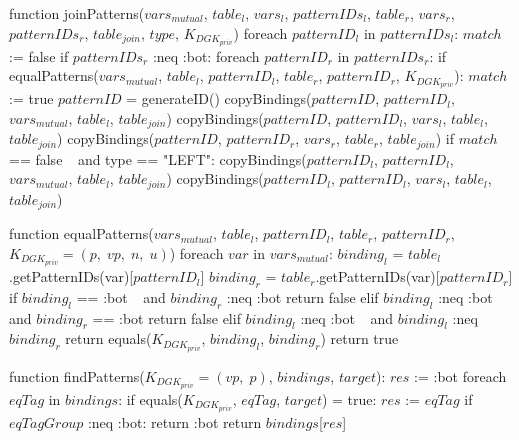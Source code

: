 function joinPatterns($vars_{mutual}$, $table_l$, $vars_l$, $patternIDs_l$, $table_r$, $vars_r$, $patternIDs_r$, $table_{join}$, $type$, $K_{DGK_{priv}}$) 
    foreach $patternID_l$ in $patternIDs_l$:
        $match$ := false
        if $patternIDs_r$ :neq :bot:
            foreach $patternID_r$ in $patternIDs_r$:
                if equalPatterns($vars_{mutual}$, $table_l$, $patternID_l$, $table_r$, $patternID_r$, $K_{DGK_{priv}}$): 
                    $match$ := true
                    $patternID$ = generateID()
                    copyBindings($patternID$, $patternID_l$, $vars_{mutual}$, $table_l$, $table_{join}$)
                    copyBindings($patternID$, $patternID_l$, $vars_l$, $table_l$, $table_{join}$)
                    copyBindings($patternID$, $patternID_r$, $vars_r$, $table_r$, $table_{join}$)
        if $match$ == false $\:\:$ and type == "LEFT": 
            copyBindings($patternID_l$, $patternID_l$, $vars_{mutual}$, $table_l$, $table_{join}$)
            copyBindings($patternID_l$, $patternID_l$, $vars_l$, $table_l$, $table_{join}$)

function equalPatterns($vars_{mutual}$, $table_l$, $patternID_l$, $table_r$, $patternID_r$, $K_{DGK_{priv}} = (p, \; vp, \; n, \; u)$) 
    foreach $var$ in $vars_{mutual}$: 
        $binding_l$ = $table_l$.getPatternIDs(var)[$patternID_l$]
        $binding_r$ = $table_r$.getPatternIDs(var)[$patternID_r$]
        if $binding_l$ == :bot $\:\:$ and $binding_r$ :neq :bot
            return false
        elif $binding_l$ :neq :bot $\:\:$ and $binding_r$ == :bot
            return false
        elif $binding_l$ :neq :bot $\:\:$ and $binding_l$ :neq $binding_r$
            return equals($K_{DGK_{priv}}$, $binding_l$, $binding_r$)
    return true

function findPatterns($K_{DGK_{priv}} = (vp, \; p)$, $bindings$, $target$):
    $res$ := :bot
    foreach $eqTag$ in $bindings$:
        if equals($K_{DGK_{priv}}$, $eqTag$, $target$) = true:
            $res$ := $eqTag$
    if $eqTagGroup$ :neq :bot:
        return :bot
    return $bindings$[$res$]